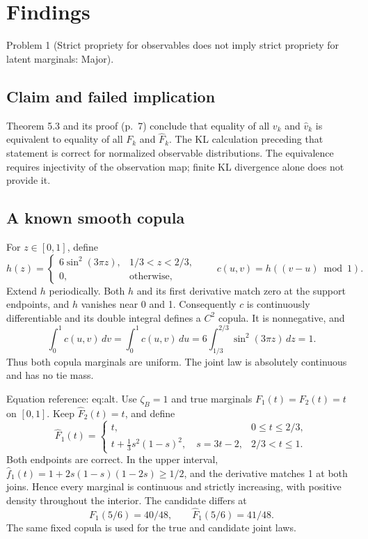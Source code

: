 \documentclass[10pt]{article}
\begin{document}
\section*{Findings}
Problem 1 (Strict propriety for observables does not imply strict propriety for latent marginals: Major).\par
\subsection*{Claim and failed implication}
Theorem 5.3 and its proof (p. 7) conclude that equality of all \(v_k\) and \(\widehat v_k\) is equivalent to equality of all \(F_k\) and \(\widehat F_k\). The KL calculation preceding that statement is correct for normalized observable distributions. The equivalence requires injectivity of the observation map; finite KL divergence alone does not provide it.\par
\subsection*{A known smooth copula}
For \(z\in[0,1]\), define \[h(z)=
 \begin{cases}
 6\sin^2(3\pi z),&1/3<z<2/3,\\
 0,&\text{otherwise},
 \end{cases}
 \qquad c(u,v)=h((v-u)\bmod 1).\] Extend \(h\) periodically. Both \(h\) and its first derivative match zero at the support endpoints, and \(h\) vanishes near 0 and 1. Consequently \(c\) is continuously differentiable and its double integral defines a \(C^2\) copula. It is nonnegative, and \[\int_0^1c(u,v)\,dv=\int_0^1c(u,v)\,du
 =6\int_{1/3}^{2/3}\sin^2(3\pi z)\,dz=1.\] Thus both copula marginals are uniform. The joint law is absolutely continuous and has no tie mass.\par
Equation reference: eq:alt. Use \(\zeta_B=1\) and true marginals \(F_1(t)=F_2(t)=t\) on \([0,1]\). Keep \(\widehat F_2(t)=t\), and define \[
 \widehat F_1(t)=
 \begin{cases}
 t,&0\leq t\leq2/3,\\
 t+\frac13s^2(1-s)^2,\quad s=3t-2,&2/3<t\leq1.
 \end{cases}\] Both endpoints are correct. In the upper interval, \(\widehat f_1(t)=1+2s(1-s)(1-2s)\geq1/2\), and the derivative matches 1 at both joins. Hence every marginal is continuous and strictly increasing, with positive density throughout the interior. The candidate differs at \[F_1(5/6)=40/48,\qquad \widehat F_1(5/6)=41/48.\] The same fixed copula is used for the true and candidate joint laws.\par
\end{document}
